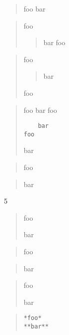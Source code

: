 
\def\mytitle{Blockquotes}


\begin{quote}
foo
bar
\end{quote}

\begin{quote}
foo

\begin{quote}
bar
foo
\end{quote}
\end{quote}

\begin{quote}
foo

\begin{quote}
bar
\end{quote}

foo
\end{quote}

\begin{quote}
foo
bar
 foo

\begin{verbatim}
	bar
foo
\end{verbatim}

bar
\end{quote}

\begin{quote}
foo
\end{quote}

\begin{quote}
bar
\end{quote}

5

\begin{quote}
foo

bar
\end{quote}

\begin{quote}
foo
\end{quote}

\begin{quote}
bar
\end{quote}

\begin{quote}
foo

bar
\end{quote}

\begin{quote}
\begin{verbatim}
*foo*
**bar**
\end{verbatim}
\end{quote}

